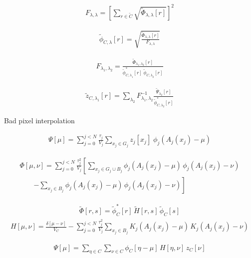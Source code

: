 \documentclass{amsart}
\begin{document}
\begin{align}
F_{\lambda,\lambda} =
\left[\sum_{r \in \widetilde{C}}
    \sqrt{\widetilde{\Phi}_{\lambda,\lambda}[r]}
\right]^2
\end{align}


\begin{align}
\widetilde{\phi}_{C,\lambda}[r] =
\sqrt{
    \frac{
        \widetilde{\Phi}_{\lambda,\lambda}[r]
    } {
        F_{\lambda,\lambda}
    }
}
\end{align}

\begin{align}
    F_{\lambda_1,\lambda_2}
    =
    \frac{
        \widetilde{\Phi}_{\lambda_1,\lambda_2}[r]
    }{
        \widetilde{\phi}^*_{C,\lambda_1}[r]
        \;
        \widetilde{\phi}_{C,\lambda_2}[r]
    }
\end{align}

\begin{align}
\widetilde{z}_{C,\lambda_1}[r]
= \sum_{\lambda_2}
F^{-1}_{\lambda_1,\lambda_2}
\frac{
    \widetilde{\Psi}_{\lambda_2}[r]
}{
    \widetilde{\phi}^*_{C,\lambda_2}[r]
}
\end{align}


Bad pixel interpolation

\begin{align}
\Psi[\mu] =
\sum_{j=0}^{j<N}
\frac{\tau_j}{V_j}
\sum_{x_j \in {G}_j}
z_j[x_j]
\;
\phi_{j}\!\left( A_j(x_j) - \mu \right)
\end{align}

\begin{align}
\Phi[\mu,\nu] =
\sum_{j=0}^{j<N}
\frac{\tau_j^2}{V_j}
\left[
\sum_{x_j \in {G}_j \cup {B}_j}
\phi_{j}\!\left( A_j(x_j) - \mu \right)
\,
\phi_{j}\!\left( A_j(x_j) - \nu \right)
\right.
\\
\quad\quad
\left.
-
\sum_{x_j \in {B}_j}
\phi_{j}\!\left( A_j(x_j) - \mu \right)
\,
\phi_{j}\!\left( A_j(x_j) - \nu \right)
\right]
\end{align}

\begin{align}
\widetilde{\Phi}[r, s]
=
\widetilde{\phi}^*_C[r]
\,
\widetilde{H}[r,s]
\,
\widetilde{\phi}_C[s]
\end{align}
\begin{align}
H[\mu,\nu]
= \frac{\delta[\mu-\nu]}{V_C} -
\sum_{j=0}^{j<N}
\frac{\tau_j^2}{V_j}
\sum_{x_j \in {B}_j}
K_{j}\!\left( A_j(x_j) - \mu \right)
\,
K_{j}\!\left( A_j(x_j) - \nu \right)
\end{align}

\begin{align}
\Psi[\mu] =
\sum_{\eta \in C}
\sum_{\nu \in C}
\phi_C[\eta - \mu]
\,
H[\eta,\nu]
\,
z_C[\nu]
\end{align}
\end{document}
